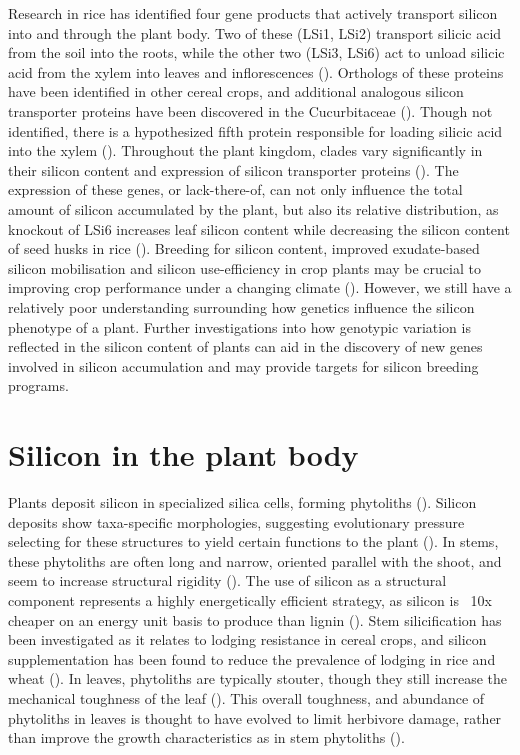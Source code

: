 \documentclass[12pt, letterpaper]{report}
\begin{document}
Research in rice has identified four gene products that actively transport silicon into and through the plant body. Two of these (LSi1, LSi2) transport silicic acid from the soil into the roots, while the other two (LSi3, LSi6) act to unload silicic acid from the xylem into leaves and inflorescences (\cite{yamaji_orchestration_2015}). Orthologs of these proteins have been identified in other cereal crops, and additional analogous silicon transporter proteins have been discovered in the Cucurbitaceae (\cite{reynolds_silicon_2016}). Though not identified, there is a hypothesized fifth protein responsible for loading silicic acid into the xylem (\cite{farooq_silicon_2015}). Throughout the plant kingdom, clades vary significantly in their silicon content and expression of silicon transporter proteins (\cite{ma_chapter_2001}). The expression of these genes, or lack-there-of, can not only influence the total amount of silicon accumulated by the plant, but also its relative distribution, as knockout of LSi6 increases leaf silicon content while decreasing the silicon content of seed husks in rice (\cite{yamaji_transporter_2008,yamaji_orchestration_2015}). Breeding for silicon content, improved exudate-based silicon mobilisation and silicon use-efficiency in crop plants may be crucial to improving crop performance under a changing climate (\cite{de_tombeur_silicon_2021,christian_breeding_2022}). However, we still have a relatively poor understanding surrounding how genetics influence the silicon phenotype of a plant. Further investigations into how genotypic variation is reflected in the silicon content of plants can aid in the discovery of new genes involved in silicon accumulation and may provide targets for silicon breeding programs. 

\section{Silicon in the plant body}

Plants deposit silicon in specialized silica cells, forming phytoliths (\cite{waterman_short-term_2021-1}). Silicon deposits show taxa-specific morphologies, suggesting evolutionary pressure selecting for these structures to yield certain functions to the plant (\cite{piperno_phytoliths_2006}). In stems, these phytoliths are often long and narrow, oriented parallel with the shoot, and seem to increase structural rigidity (\cite{stromberg_functions_2016}). The use of silicon as a structural component represents a highly energetically efficient strategy, as silicon is ~10x cheaper on an energy unit basis to produce than lignin (\cite{stromberg_functions_2016}). Stem silicification has been investigated as it relates to lodging resistance in cereal crops, and silicon supplementation has been found to reduce the prevalence of lodging in rice and wheat (\cite{dorairaj_influence_2017,muszynska_mechanistic_2021}). In leaves, phytoliths are typically stouter, though they still increase the mechanical toughness of the leaf (\cite{simpson_still_2017}). This overall toughness, and abundance of phytoliths in leaves is thought to have evolved to limit herbivore damage, rather than improve the growth characteristics as in stem phytoliths (\cite{stromberg_functions_2016}).
\end{document}
